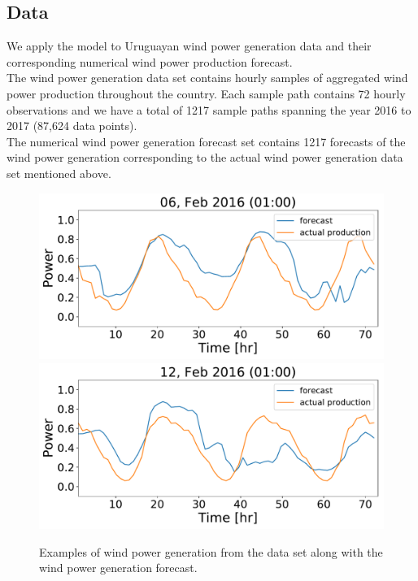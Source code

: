 \documentclass[ima, 20pt, portrait, plainboxedsections]{sciposter}
\begin{document}
\begin{multicols}{3}
\section*{Data}

We apply the model to Uruguayan wind power generation data and their corresponding numerical wind power production forecast. \\

The wind power generation data set contains hourly samples of aggregated wind power production throughout the country. Each sample path contains 72 hourly observations and we have a total of 1217 sample paths spanning the year 2016 to 2017 (87,624 data points). \\

The numerical wind power generation forecast set contains  1217 forecasts of the wind power generation  corresponding to the actual  wind power generation data set mentioned above.

\begin{figure}[t]
\begin{center}
   \includegraphics[width=0.8\linewidth]{Forecast_data_68.pdf}
    \includegraphics[width=0.8\linewidth]{Forecast_data_82.pdf}
\end{center}
   \caption{Examples of wind power generation from the data set along with the wind power generation forecast.}
\label{fig:long}
\label{fig:onecol}
\end{figure}


\end{multicols}
\end{document}
